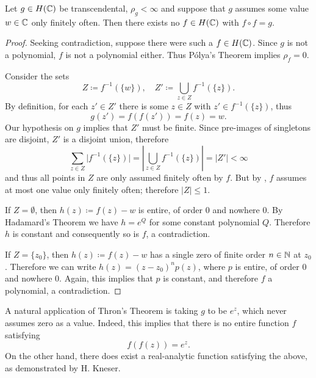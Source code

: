 \begin{theorem}[Thron] \label{thm:thron}
    Let $g \in H(\mathbb{C})$ be transcendental, $\rho_g < \infty$ and suppose that $g$ assumes some value $w \in \mathbb{C}$ only finitely often. Then there exists no $f \in H(\mathbb{C})$ with $f \circ f = g$.
\end{theorem}

\begin{proof}
    Seeking contradiction, suppose there were such a $f \in H(\mathbb{C})$. Since $g$ is not a polynomial, $f$ is not a polynomial either. Thus Pólya's Theorem implies $\rho_f = 0$.
    
    Consider the sets
    $$ Z \coloneqq f^{-1}(\{ w \}), \quad Z' \coloneqq \bigcup_{z \in Z} f^{-1}(\{ z \}). $$
    By definition, for each $z' \in Z'$ there is some $z \in Z$ with $z' \in f^{-1}(\{ z \})$, thus
    $$ g(z') = f(f(z')) = f(z) = w. $$
    Our hypothesis on $g$ implies that $Z'$ must be finite. Since pre-images of singletons are disjoint, $Z'$ is a disjoint union, therefore
    $$ \sum_{z \in Z} \vert f^{-1}(\{ z \}) \vert = \left\vert \bigcup_{z \in Z} f^{-1}(\{ z \}) \right\vert = \vert Z' \vert < \infty $$
    and thus all points in $Z$ are only assumed finitely often by $f$. But by , $f$ assumes at most one value only finitely often; therefore $\vert Z \vert \leq 1$.

    If $Z = \emptyset$, then $h(z) \coloneqq f(z) - w$ is entire, of order $0$ and nowhere $0$. By Hadamard's Theorem we have $h = e^Q$ for some constant polynomial $Q$. Therefore $h$ is constant and consequently so is $f$, a contradiction.

    If $Z = \{ z_0 \}$, then $h(z) \coloneqq f(z) - w$ has a single zero of finite order $n \in \mathbb{N}$ at $z_0$. Therefore we can write $h(z) = (z - z_0)^n p(z)$, where $p$ is entire, of order $0$ and nowhere $0$. Again, this implies that $p$ is constant, and therefore $f$ a polynomial, a contradiction.
\end{proof}

\begin{example}
    A natural application of Thron's Theorem is taking $g$ to be $e^z$, which never assumes zero as a value. Indeed, this implies that there is no entire function $f$ satisfying
    $$ f(f(z)) = e^z. $$
    On the other hand, there does exist a real-analytic function satisfying the above, as demonstrated by H. Kneser. 
\end{example}